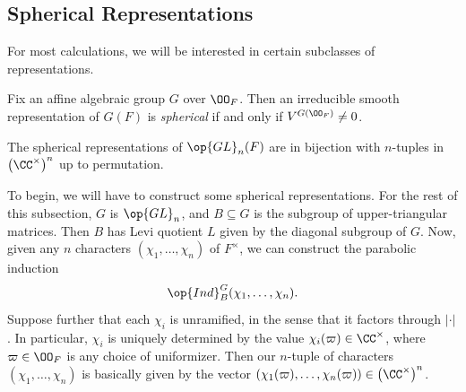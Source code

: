 \documentclass[../notes.tex]{subfiles}
\begin{document}
\subsection{Spherical Representations}
For most calculations, we will be interested in certain subclasses of representations.
\begin{definition}[spherical]
	Fix an affine algebraic group $G$ over $\OO_F$. Then an irreducible smooth representation of $G(F)$ is \textit{spherical} if and only if $V^{G(\OO_F)}\ne0$.
\end{definition}
\begin{theorem}
	The spherical representations of $\op{GL}_n(F)$ are in bijection with $n$-tuples in $\left(\CC^\times\right)^n$ up to permutation.
\end{theorem}
To begin, we will have to construct some spherical representations. For the rest of this subsection, $G$ is $\op{GL}_n$, and $B\subseteq G$ is the subgroup of upper-triangular matrices. Then $B$ has Levi quotient $L$ given by the diagonal subgroup of $G$. Now, given any $n$ characters $(\chi_1,\ldots,\chi_n)$ of $F^\times$, we can construct the parabolic induction
\[\op{Ind}_B^G(\chi_1,\ldots,\chi_n).\]
Suppose further that each $\chi_i$ is unramified, in the sense that it factors through $\left|\cdot\right|$. In particular, $\chi_i$ is uniquely determined by the value $\chi_i(\varpi)\in\CC^\times$, where $\varpi\in\OO_F$ is any choice of uniformizer. Then our $n$-tuple of characters $(\chi_1,\ldots,\chi_n)$ is basically given by the vector $(\chi_1(\varpi),\ldots,\chi_n(\varpi))\in\left(\CC^\times\right)^n$.
\end{document}
